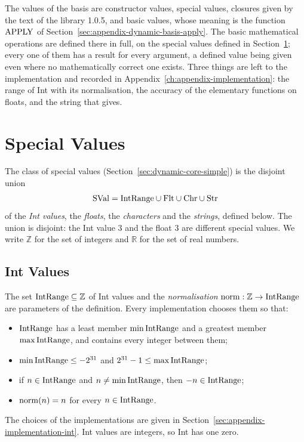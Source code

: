 The values of the basis are constructor values, special values, closures
given by the text of the library  1.0.5, and basic values, whose
meaning is the function $\mathrm{APPLY}$ of Section~\ref{sec:appendix-dynamic-basis-apply}.
The basic mathematical operations are defined there in full, on the special
values defined in Section~\ref{sec:appendix-dynamic-basis-svals}; every one
of them has a result for every argument, a defined value being given even
where no mathematically correct one exists. %
Three things are left to the implementation and recorded in
Appendix~\ref{ch:appendix-implementation}: the range of Int with its
normalisation, the accuracy of the elementary functions on floats, and the
string that  gives. %

\section{Special Values}\label{sec:appendix-dynamic-basis-svals}

The class of special values (Section~\ref{sec:dynamic-core-simple}) is the
disjoint union
\[
  \mathrm{SVal}=\mathrm{IntRange}\cup\mathrm{Flt}\cup\mathrm{Chr}\cup\mathrm{Str}
\]
of the \emph{Int values}, the \emph{floats}, the \emph{characters} and the
\emph{strings}, defined below. The union is disjoint: the Int value $3$ and
the float $3$ are different special values. We write $\mathbb{Z}$ for the set
of integers and $\mathbb{R}$ for the set of real numbers.

\subsection{Int Values}\label{sec:appendix-dynamic-basis-ints}

The set $\mathrm{IntRange}\subseteq\mathbb{Z}$ of Int values and the
\emph{normalisation} $\mathrm{norm}:\mathbb{Z}\to\mathrm{IntRange}$ are parameters of the
definition. Every implementation chooses them so that:
\begin{itemize}
\item $\mathrm{IntRange}$ has a least member $\min\mathrm{IntRange}$ and a greatest member
  $\max\mathrm{IntRange}$, and contains every integer between them;
\item $\min\mathrm{IntRange}\leq -2^{31}$ and $2^{31}-1\leq\max\mathrm{IntRange}$;
\item if $n\in\mathrm{IntRange}$ and $n\neq\min\mathrm{IntRange}$, then $-n\in\mathrm{IntRange}$;
\item $\mathrm{norm}(n)=n$ for every $n\in\mathrm{IntRange}$.
\end{itemize}
The choices of the implementations are given in
Section~\ref{sec:appendix-implementation-int}. Int values are integers, so Int
has one zero. %

